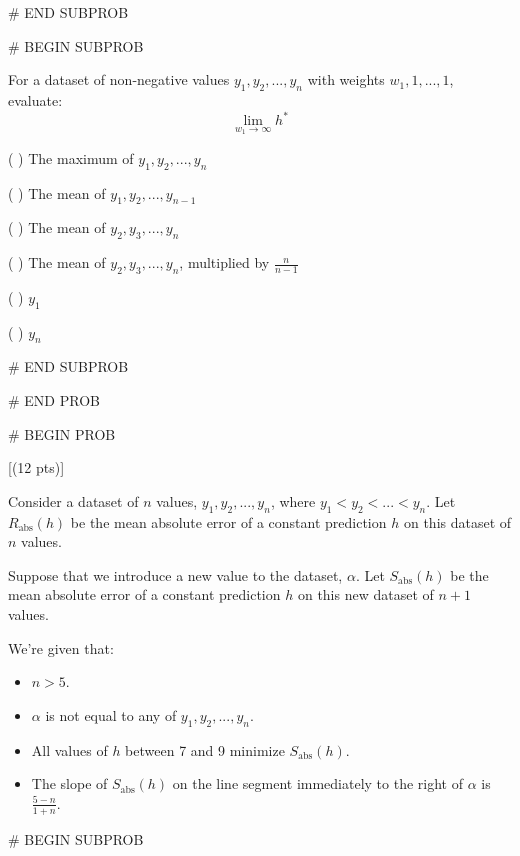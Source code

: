 \documentclass[twoside,12pt]{article}
\begin{document}
{\begin{responsebox}{5in}

\end{responsebox}
    


# END SUBPROB

# BEGIN SUBPROB

 For a dataset of non-negative values $y_1, y_2, ..., y_n$ with weights $w_1, 1, ..., 1$, evaluate: $$\displaystyle \lim_{w_1 \rightarrow \infty} h^*$$

( ) The maximum of $y_1, y_2, ..., y_n$

( ) The mean of $y_1, y_2, ..., y_{n-1}$

( ) The mean of $y_2, y_3, ..., y_n$

( ) The mean of $y_2, y_3, ..., y_n$, multiplied by $\frac{n}{n-1}$

( ) $y_1$

( ) $y_n$

    


# END SUBPROB
    

    


# END PROB

\newpage

# BEGIN PROB

[(12 pts)]

Consider a dataset of $n$ values, $y_1, y_2, ..., y_n$, where $y_1 < y_2 < ... < y_n$. Let $R_\text{abs}(h)$ be the mean absolute error of a constant prediction $h$ on this dataset of $n$ values.

Suppose that we introduce a new value to the dataset, $\alpha$. Let $S_\text{abs}(h)$ be the mean absolute error of a constant prediction $h$ on this new dataset of $n + 1$ values.

We're given that:

\begin{itemize}
    \item $n > 5$.
    \item $\alpha$ is not equal to any of $y_1, y_2, ..., y_n$. 
    \item All values of $h$ between 7 and 9 minimize $S_\text{abs}(h)$.
    \item The slope of $S_\text{abs}(h)$ on the line segment immediately to the right of $\alpha$ is $\frac{5-n}{1 + n}$.
\end{itemize}



# BEGIN SUBPROB

}
\end{document}
